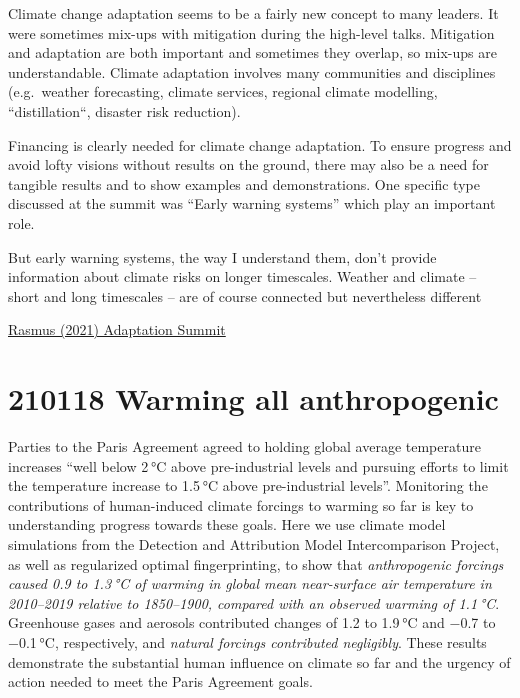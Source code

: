 \documentclass[
]{book}
\begin{document}
Climate change adaptation seems to be a fairly new concept to many leaders. It were sometimes mix-ups with mitigation during the high-level talks.
Mitigation and adaptation are both important and sometimes they overlap, so mix-ups are understandable.
Climate adaptation involves many communities and disciplines (e.g.~weather forecasting, climate services, regional climate modelling, ``distillation``, disaster risk reduction).

Financing is clearly needed for climate change adaptation. To ensure progress and avoid lofty visions without results on the ground, there may also be a need for tangible results and to show examples and demonstrations. One specific type discussed at the summit was ``Early warning systems'' which play an important role.

But early warning systems, the way I understand them, don't provide information about climate risks on longer timescales. Weather and climate -- short and long timescales -- are of course connected but nevertheless different

\href{http://www.realclimate.org/index.php/archives/2021/01/climate-adaptation-summit-2021/}{Rasmus (2021) Adaptation Summit}

\hypertarget{warming-all-anthropogenic}{%
\section{210118 Warming all anthropogenic}\label{warming-all-anthropogenic}}

Parties to the Paris Agreement agreed to holding global average temperature increases ``well below 2 °C above pre-industrial levels and pursuing efforts to limit the temperature increase to 1.5 °C above pre-industrial levels''. Monitoring the contributions of human-induced climate forcings to warming so far is key to understanding progress towards these goals. Here we use climate model simulations from the Detection and Attribution Model Intercomparison Project, as well as regularized optimal fingerprinting, to show that \emph{anthropogenic forcings caused 0.9 to 1.3 °C of warming in global mean near-surface air temperature in 2010--2019 relative to 1850--1900, compared with an observed warming of 1.1 °C}. Greenhouse gases and aerosols contributed changes of 1.2 to 1.9 °C and −0.7 to −0.1 °C, respectively, and \emph{natural forcings contributed negligibly}. These results demonstrate the substantial human influence on climate so far and the urgency of action needed to meet the Paris Agreement goals.
\end{document}
